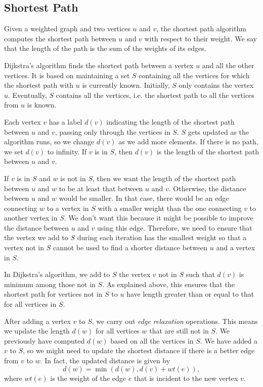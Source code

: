 \documentclass[a4paper, openany]{memoir}
\begin{document}
\subsection{Shortest Path}
Given a weighted graph and two vertices $u$ and $v$, the shortest path algorithm computes the shortest path between $u$ and $v$ with respect to their weight. We say that the length of the path is the sum of the weights of its edges.

Dijkstra's algorithm finds the shortest path between a vertex $u$ and all the other vertices. It is based on maintaining a set $S$ containing all the vertices for which the shortest path with $u$ is currently known. Initially, $S$ only contains the vertex $u$. Eventually, $S$ contains all the vertices, i.e. the shortest path to all the vertices from $u$ is known. 

Each vertex $v$ has a label $d(v)$ indicating the length of the shortest path between $u$ and $v$, passing only through the vertices in $S$. $S$ gets updated as the algorithm runs, so we change $d(v)$ as we add more elements. If there is no path, we set $d(v)$ to infinity. If $v$ is in $S$, then $d(v)$ is the length of the shortest path between $u$ and $v$. 

If $v$ is in $S$ and $w$ is not in $S$, then we want the length of the shortest path between $u$ and $w$ to be at least that between $u$ and $v$. Otherwise, the distance between $u$ and $w$ would be smaller. In that case, there would be an edge connecting $w$ to a vertex in $S$ with a smaller weight than the one connecting $v$ to another vertex in $S$. We don't want this because it might be possible to improve the distance between $u$ and $v$ using this edge. Therefore, we need to ensure that the vertex we add to $S$ during each iteration has the smallest weight so that a vertex not in $S$ cannot be used to find a shorter distance between $u$ and a vertex in $S$.

In Dijkstra's algorithm, we add to $S$ the vertex $v$ not in $S$ such that $d(v)$ is minimum among those not in $S$. As explained above, this ensures that the shortest path for vertices not in $S$ to $u$ have length greater than or equal to that for all vertices in $S$.

After adding a vertex $v$ to $S$, we carry out \emph{edge relaxation} operations. This means we update the length $d(w)$ for all vertices $w$ that are still not in $S$. We previously have computed $d(w)$ based on all the vertices in $S$. We have added a $v$ to $S$, so we might need to update the shortest distance if there is a better edge from $v$ to $w$. In fact, the updated distance is given by
\[d(w) = \min(d(w), d(v) + wt(e)),\]
where $wt(e)$ is the weight of the edge $e$ that is incident to the new vertex $v$.
\end{document}
